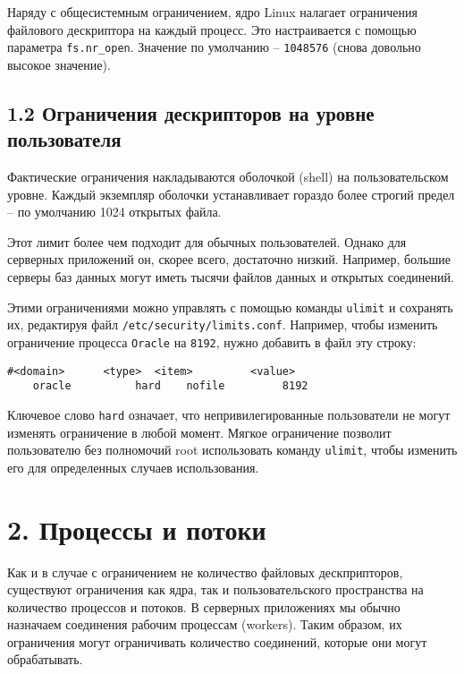 Наряду с общесистемным ограничением, ядро Linux налагает ограничения файлового дескриптора на каждый процесс. Это настраивается с помощью параметра \texttt{fs.nr\_open}. Значение по умолчанию -- \texttt{1048576} (снова довольно высокое значение).

\subsection*{1.2 Ограничения дескрипторов на уровне пользователя}

Фактические ограничения накладываются оболочкой (shell) на пользовательском уровне. Каждый экземпляр оболочки устанавливает гораздо более строгий предел -- по умолчанию 1024 открытых файла.

Этот лимит более чем подходит для обычных пользователей. Однако для серверных приложений он, скорее всего, достаточно низкий. Например, большие серверы баз данных могут иметь тысячи файлов данных и открытых соединений.

Этими ограничениями можно управлять с помощью команды \texttt{ulimit} и сохранять их, редактируя файл \texttt{/etc/security/limits.conf}. Например, чтобы изменить ограничение процесса \texttt{Oracle} на \texttt{8192}, нужно добавить в файл эту строку:

\begin{lstlisting}[style=CommandLineStyle]
    #<domain>      <type>  <item>         <value>
    oracle          hard    nofile         8192
\end{lstlisting}

Ключевое слово \texttt{hard} означает, что непривилегированные пользователи не могут изменять ограничение в любой момент. Мягкое ограничение позволит пользователю без полномочий root использовать команду \texttt{ulimit}, чтобы изменить его для определенных случаев использования.

\section*{2. Процессы и потоки}

Как и в случае с ограничением не количество файловых дескприпторов, существуют ограничения как ядра, так и пользовательского пространства на количество процессов и потоков. В серверных приложениях мы обычно назначаем соединения рабочим процессам (workers). Таким образом, их ограничения могут ограничивать количество соединений, которые они могут обрабатывать.


